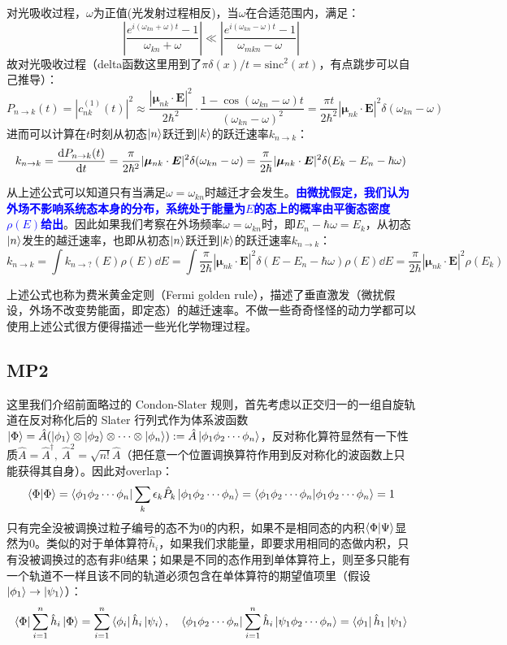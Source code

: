 对光吸收过程，$\omega$为正值(光发射过程相反)，当$\omega$在合适范围内，满足：
\[\left|\frac{e^{i(\omega_{kn}+\omega)t}-1}{\omega_{kn} + \omega}\right| \ll \left|\frac{e^{i(\omega_{kn}-\omega)t}-1}{\omega_{mkn}-\omega}\right|\]
故对光吸收过程（delta函数这里用到了$\pi\delta(x)/t=\mathrm{sinc}^2(xt)$，有点跳步可以自己推导）：
\[P_{n \to k}(t)=|c_{nk}^{(1)}(t)|^2\approx\frac{|\bm{\mu}_{nk}\cdot\bm{E}|^2}{2\hbar^2}\cdot\frac{1-\cos{(\omega_{kn}-\omega)t}}{(\omega_{kn}-\omega)^2}=\frac{\pi t}{2\hbar^2}|\bm{\mu}_{nk}\cdot\bm{E}|^2\delta(\omega_{kn}-\omega)\]
进而可以计算在$t$时刻从初态$\ket{n}$跃迁到$\ket{k}$的跃迁速率$k_{n \to k}$：
\[k_{n \to k}=\dv{P_{n \to k}(t)}{t}=\frac{\pi}{2\hbar^2}|\bm{\mu}_{nk}\cdot\bm{E}|^2\delta(\omega_{kn}-\omega)=\frac{\pi}{2\hbar}|\bm{\mu}_{nk}\cdot\bm{E}|^2\delta(E_k-E_n-\hbar\omega)\]

从上述公式可以知道只有当满足$\omega=\omega_{kn}$时越迁才会发生。\textcolor{blue}{\textbf{由微扰假定，我们认为外场不影响系统态本身的分布，系统处于能量为$E$的态上的概率由平衡态密度$\rho(E)$给出}}。因此如果我们考察在外场频率$\omega=\omega_{kn}$时，即$E_n-\hbar\omega=E_k$，从初态$\ket{n}$发生的越迁速率，也即从初态$\ket{n}$跃迁到$\ket{k}$的跃迁速率$k_{n \to k}$：
\[k_{n \to k}=\int k_{n \to ?}(E)\rho(E)\dd{E}=\int \frac{\pi}{2\hbar}|\bm{\mu}_{nk}\cdot\bm{E}|^2\delta(E-E_n-\hbar\omega)\rho(E)\dd{E}=\frac{\pi}{2\hbar}|\bm{\mu}_{nk}\cdot\bm{E}|^2\rho(E_k)\]

上述公式也称为费米黄金定则（Fermi golden rule），描述了垂直激发（微扰假设，外场不改变势能面，即定态）的越迁速率。不做一些奇奇怪怪的动力学都可以使用上述公式很方便得描述一些光化学物理过程。

\subsection{MP2}\label{sec:mp}
这里我们介绍前面略过的 Condon-Slater 规则，首先考虑以正交归一的一组自旋轨道在反对称化后的 Slater 行列式作为体系波函数$\ket{\Phi}=\hat{A}(\ket{\phi_1}\otimes\ket{\phi_2}\otimes\cdots\otimes\ket{\phi_n}):=\hat{A}\ket{\phi_1\phi_2\cdots\phi_n}$，反对称化算符显然有一下性质$\hat{A}=\hat{A}^{\dagger}, \ \hat{A}^2=\sqrt{n!}\hat{A}$（把任意一个位置调换算符作用到反对称化的波函数上只能获得其自身）。因此对overlap：
\[\bra{\Phi}\ket{\Phi}=\bra{\phi_1\phi_2\cdots\phi_n}\sum_k\epsilon_k\hat{P}_k\ket{\phi_1\phi_2\cdots\phi_n}=\bra{\phi_1\phi_2\cdots\phi_n}\ket{\phi_1\phi_2\cdots\phi_n}=1\]
只有完全没被调换过粒子编号的态不为0的内积，如果不是相同态的内积$\bra{\Phi}\ket{\Psi}$显然为0。类似的对于单体算符$\hat{h}_i$，如果我们求能量，即要求用相同的态做内积，只有没被调换过的态有非0结果；如果是不同的态作用到单体算符上，则至多只能有一个轨道不一样且该不同的轨道必须包含在单体算符的期望值项里（假设$\ket{\phi_1}\to\ket{\psi_1}$）：
\[\bra{\Phi}\sum_{i=1}^{n}\hat{h}_i\ket{\Phi}=\sum_{i=1}^{n}\bra{\phi_i}\hat{h}_i\ket{\psi_i}, \quad \bra{\phi_1\phi_2\cdots\phi_n}\sum_{i=1}^{n}\hat{h}_i\ket{\psi_1\phi_2\cdots\phi_n}=\bra{\phi_1}\hat{h}_1\ket{\psi_1}\]

